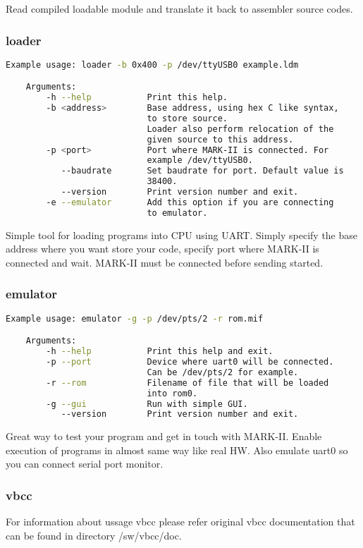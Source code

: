 Read compiled loadable module and translate it back to assembler source codes.

\subsubsection{loader}

\begin{lstlisting}[language=bash, frame=single]
    Example usage: loader -b 0x400 -p /dev/ttyUSB0 example.ldm

    Arguments:
        -h --help           Print this help.
        -b <address>        Base address, using hex C like syntax,
                            to store source.
                            Loader also perform relocation of the
                            given source to this address.
        -p <port>           Port where MARK-II is connected. For
                            example /dev/ttyUSB0.
           --baudrate       Set baudrate for port. Default value is
                            38400.
           --version        Print version number and exit.
        -e --emulator       Add this option if you are connecting
                            to emulator.
\end{lstlisting}

Simple tool for loading programs into CPU using UART. Simply specify the base
address where you want store your code, specify port where MARK-II is connected
and wait. MARK-II must be connected before sending started.

\subsubsection{emulator}

\begin{lstlisting}[language=bash, frame=single]
    Example usage: emulator -g -p /dev/pts/2 -r rom.mif

    Arguments:
        -h --help           Print this help and exit.
        -p --port           Device where uart0 will be connected.
                            Can be /dev/pts/2 for example.
        -r --rom            Filename of file that will be loaded
                            into rom0.
        -g --gui            Run with simple GUI.
           --version        Print version number and exit.
\end{lstlisting}

Great way to test your program and get in touch with MARK-II. Enable execution
of programs in almost same way like real HW. Also emulate uart0 so you can
connect serial port monitor.

\subsubsection{vbcc}

For information about ussage vbcc please refer original vbcc documentation that
can be found in directory /sw/vbcc/doc.
